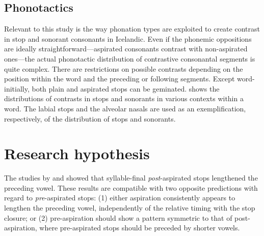 \documentclass[11pt,a4paper,oneside,openany]{memoir}\usepackage[]{graphicx}\usepackage[]{color}
\begin{document}
\subsection{Phonotactics}


Relevant to this study is the way phonation types are exploited to create contrast in stop and sonorant consonants in Icelandic.
Even if the phonemic oppositions are ideally straightforward---aspirated consonants contrast with non-aspirated ones---the actual phonotactic distribution of contrastive consonantal segments is quite complex.
There are restrictions on possible contrasts depending on the position within the word and the preceding or following segments. Except word-initially, both plain and aspirated stops can be geminated.
 shows the distributions of contrasts in stops and sonorants in various contexts within a word.
The labial stops and the alveolar nasals are used as an exemplification, respectively, of the distribution of stops and sonorants.


\section{Research hypothesis}
\label{s:hypothesis}

The studies by \citet{maddieson1976} and \citet{durvasula2012} showed that syllable-final \textit{post}-aspirated stops lengthened the preceding vowel.
These results are compatible with two opposite predictions with regard to \textit{pre}-aspirated stops: (1) either aspiration consistently appears to lengthen the preceding vowel, independently of the relative timing with the stop closure; or (2) pre-aspiration should show a pattern symmetric to that of post-aspiration, where pre-aspirated stops should be preceded by shorter vowels.
\end{document}
